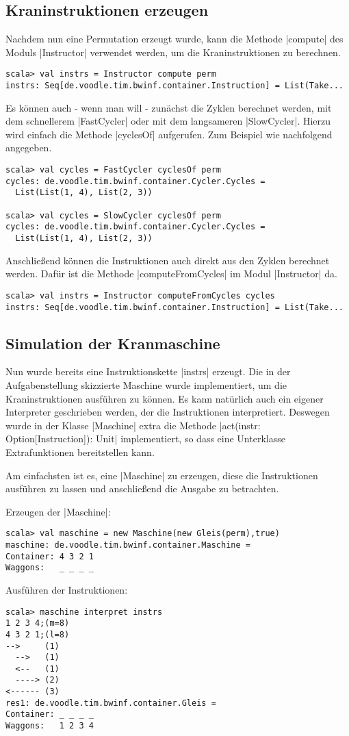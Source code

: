 \subsection{Kraninstruktionen erzeugen}
Nachdem nun eine Permutation erzeugt wurde, kann die Methode |compute| des Moduls |Instructor| verwendet werden, um die Kraninstruktionen zu berechnen.
\begin{lstlisting}
scala> val instrs = Instructor compute perm
instrs: Seq[de.voodle.tim.bwinf.container.Instruction] = List(Take...
\end{lstlisting}
Es können auch - wenn man will - zunächst die Zyklen berechnet werden, mit dem schnellerem |FastCycler| oder mit dem langsameren |SlowCycler|.
Hierzu wird einfach die Methode |cyclesOf| aufgerufen. Zum Beispiel wie nachfolgend angegeben.
\begin{lstlisting}
scala> val cycles = FastCycler cyclesOf perm
cycles: de.voodle.tim.bwinf.container.Cycler.Cycles =
  List(List(1, 4), List(2, 3))

scala> val cycles = SlowCycler cyclesOf perm
cycles: de.voodle.tim.bwinf.container.Cycler.Cycles =
  List(List(1, 4), List(2, 3))
\end{lstlisting}
Anschließend können die Instruktionen auch direkt aus den Zyklen berechnet werden. Dafür ist die Methode |computeFromCycles| im Modul |Instructor| da.
\begin{lstlisting}
scala> val instrs = Instructor computeFromCycles cycles
instrs: Seq[de.voodle.tim.bwinf.container.Instruction] = List(Take...
\end{lstlisting}
\subsection{Simulation der Kranmaschine}
 Nun wurde bereits eine Instruktionskette |instrs| erzeugt.
 Die in der Aufgabenstellung skizzierte Maschine wurde implementiert, um die Kraninstruktionen ausführen zu können.
 Es kann natürlich auch ein eigener Interpreter geschrieben werden, der die Instruktionen interpretiert.
 Deswegen wurde in der Klasse |Maschine| extra die Methode |act(instr: Option[Instruction]): Unit| implementiert, so dass eine Unterklasse Extrafunktionen bereitstellen kann.

 Am einfachsten ist es, eine |Maschine| zu erzeugen, diese die Instruktionen ausführen zu lassen und anschließend die Ausgabe zu betrachten.

 Erzeugen der |Maschine|:
\begin{lstlisting}
scala> val maschine = new Maschine(new Gleis(perm),true)
maschine: de.voodle.tim.bwinf.container.Maschine = 
Container: 4 3 2 1
Waggons:   _ _ _ _
\end{lstlisting}
Ausführen der Instruktionen:
\begin{lstlisting}
scala> maschine interpret instrs
1 2 3 4;(m=8)
4 3 2 1;(l=8)
-->     (1)
  -->   (1)
  <--   (1)
  ----> (2)
<------ (3)
res1: de.voodle.tim.bwinf.container.Gleis = 
Container: _ _ _ _
Waggons:   1 2 3 4
\end{lstlisting}
